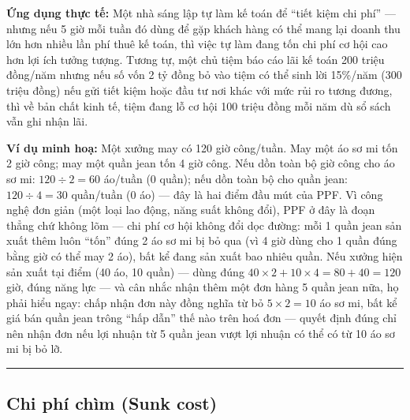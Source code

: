 \documentclass[
]{article}
\begin{document}
\textbf{Ứng dụng thực tế:} Một nhà sáng lập tự làm kế toán để ``tiết
kiệm chi phí'' --- nhưng nếu 5 giờ mỗi tuần đó dùng để gặp khách hàng có
thể mang lại doanh thu lớn hơn nhiều lần phí thuê kế toán, thì việc tự
làm đang tốn chi phí cơ hội cao hơn lợi ích tưởng tượng. Tương tự, một
chủ tiệm báo cáo lãi kế toán 200 triệu đồng/năm nhưng nếu số vốn 2 tỷ
đồng bỏ vào tiệm có thể sinh lời 15\%/năm (300 triệu đồng) nếu gửi tiết
kiệm hoặc đầu tư nơi khác với mức rủi ro tương đương, thì về bản chất
kinh tế, tiệm đang lỗ cơ hội 100 triệu đồng mỗi năm dù sổ sách vẫn ghi
nhận lãi.

\textbf{Ví dụ minh hoạ:} Một xưởng may có 120 giờ công/tuần. May một áo
sơ mi tốn 2 giờ công; may một quần jean tốn 4 giờ công. Nếu dồn toàn bộ
giờ công cho áo sơ mi: \(120 \div 2 = 60\) áo/tuần (0 quần); nếu dồn
toàn bộ cho quần jean: \(120 \div 4 = 30\) quần/tuần (0 áo) --- đây là
hai điểm đầu mút của PPF. Vì công nghệ đơn giản (một loại lao động, năng
suất không đổi), PPF ở đây là đoạn thẳng chứ không lõm --- chi phí cơ
hội không đổi dọc đường: mỗi 1 quần jean sản xuất thêm luôn ``tốn'' đúng
2 áo sơ mi bị bỏ qua (vì 4 giờ dùng cho 1 quần đúng bằng giờ có thể may
2 áo), bất kể đang sản xuất bao nhiêu quần. Nếu xưởng hiện sản xuất tại
điểm (40 áo, 10 quần) --- dùng đúng
\(40 \times 2 + 10 \times 4 = 80 + 40 = 120\) giờ, đúng năng lực --- và
cân nhắc nhận thêm một đơn hàng 5 quần jean nữa, họ phải hiểu ngay: chấp
nhận đơn này đồng nghĩa từ bỏ \(5 \times 2 = 10\) áo sơ mi, bất kể giá
bán quần jean trông ``hấp dẫn'' thế nào trên hoá đơn --- quyết định đúng
chỉ nên nhận đơn nếu lợi nhuận từ 5 quần jean vượt lợi nhuận có thể có
từ 10 áo sơ mi bị bỏ lỡ.

\begin{center}\rule{0.5\linewidth}{0.5pt}\end{center}

\subsection{Chi phí chìm (Sunk
cost)}\label{chi-phuxed-chuxecm-sunk-cost}
\end{document}
